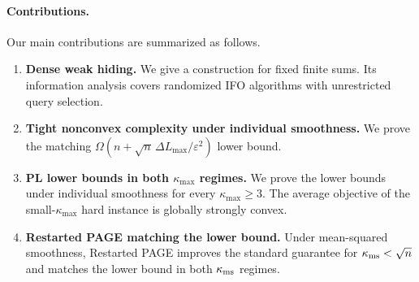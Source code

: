 \documentclass{article}
\theoremstyle{definition}
\begin{document}
\paragraph{Contributions.}
Our main contributions are summarized as follows.
\begin{enumerate}[leftmargin=*,label=\textbf{\arabic*.},itemsep=2pt,topsep=3pt]
\item \textbf{Dense weak hiding.}
We give a construction for fixed finite sums.  Its information analysis covers
randomized IFO algorithms with unrestricted query selection.

\item \textbf{Tight nonconvex complexity under individual smoothness.}
We prove the matching
$\Omega(n+\sqrt n\,\Delta L_{\max}/\varepsilon^2)$ lower bound.

\item \textbf{PL lower bounds in both $\kappa_{\max}$ regimes.}
We prove the lower bounds under individual smoothness for every
$\kappa_{\max}\ge3$.  The average objective of the small-$\kappa_{\max}$ hard
instance is globally strongly convex.

\item \textbf{Restarted PAGE matching the lower bound.}
Under mean-squared smoothness, Restarted PAGE improves the standard guarantee
for $\kappa_{\rm ms}<\sqrt n$ and matches the lower bound in both
$\kappa_{\rm ms}$ regimes.
\end{enumerate}
\end{document}
